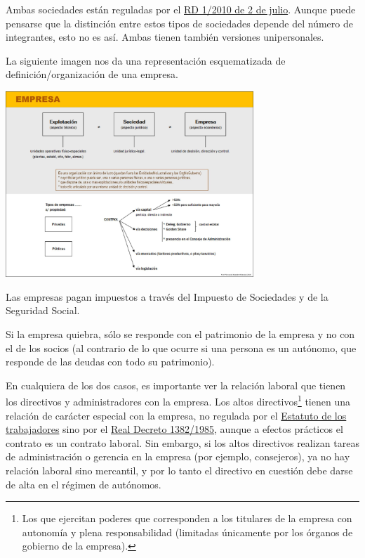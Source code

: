 \documentclass[nochap,palatino,shortheader]{apuntes}
\newcommand{\study}[1]{#1} \newcommand{\substudy}[1]{#1}
\begin{document}
Ambas sociedades están reguladas por el \href{https://www.boe.es/buscar/act.php?id=BOE-A-2010-10544}{RD 1/2010 de 2 de julio}. Aunque puede pensarse que la distinción entre estos tipos de sociedades depende del número de integrantes, esto no es así. Ambas tienen también versiones unipersonales.

La siguiente imagen nos da una representación esquematizada de definición/organización de una empresa.

\begin{center}
\includegraphics[width=0.7\textwidth]{img/empresa.png}
\label{fig:EstructuraEmpresa}
\end{center}

Las empresas pagan impuestos a través del Impuesto de Sociedades y de la Seguridad Social.

Si la empresa \study{quiebra, sólo se responde con el patrimonio de la empresa} y no con el de los socios (al contrario de lo que ocurre si una persona es un \study{autónomo, que responde de las deudas con todo su patrimonio).}

En cualquiera de los dos casos, es importante ver la relación laboral que tienen los directivos y administradores con la empresa. Los altos directivos\footnote{Los que ejercitan poderes que corresponden a los titulares de la empresa con autonomía y plena responsabilidad (limitadas únicamente por los órganos de gobierno de la empresa).} tienen una relación de carácter especial con la empresa, no regulada por el \href{https://www.boe.es/buscar/act.php?id=BOE-A-1995-7730&tn=1&vd=&p=20151024}{Estatuto de los trabajadores} sino por el \href{https://www.boe.es/diario_boe/txt.php?id=BOE-A-1985-17006}{Real Decreto 1382/1985}, aunque a efectos prácticos el contrato es un contrato laboral. Sin embargo, si los altos directivos realizan tareas de administración o gerencia en la empresa (por ejemplo, consejeros), ya no hay relación laboral sino mercantil, y por lo tanto el directivo en cuestión debe darse de alta en el régimen de autónomos.
\end{document}
